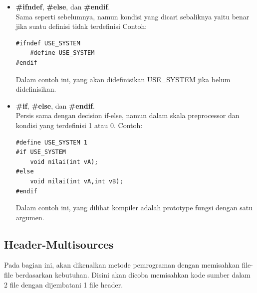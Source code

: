 \documentclass[12pt,]{article}
\begin{document}
\begin{itemize}
		\item \textbf{\#ifndef}, \textbf{\#else}, dan \textbf{\#endif}. \\
		Sama seperti sebelumnya, namun kondisi yang dicari sebaliknya yaitu benar jika suatu definisi tidak terdefinisi
		Contoh:
		\begin{verbatim}
#ifndef USE_SYSTEM
	#define USE_SYSTEM
#endif
		\end{verbatim}
		Dalam contoh ini, yang akan didefinisikan USE\_SYSTEM jika belum didefinisikan.
		
		\item \textbf{\#if}, \textbf{\#else}, dan \textbf{\#endif}. \\
		Persis sama dengan decision if-else, namun dalam skala preprocessor dan kondisi yang terdefinisi 1 atau 0.
		Contoh:
		\begin{verbatim}
#define USE_SYSTEM 1
#if USE_SYSTEM
	void nilai(int vA);
#else
	void nilai(int vA,int vB);
#endif
		\end{verbatim}
		Dalam contoh ini, yang dilihat kompiler adalah prototype fungsi dengan satu argumen.
		
	\end{itemize}
	
	
	\newpage
	\subsection{Header-Multisources}
	
	Pada bagian ini, akan dikenalkan metode pemrograman dengan memisahkan file-file berdasarkan kebutuhan.
	Disini akan dicoba memisahkan kode sumber dalam 2 file dengan dijembatani 1 file header.
	
\end{document}
